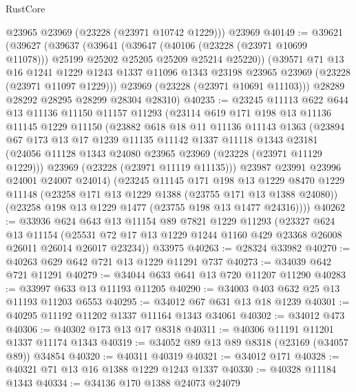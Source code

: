 \begin{lexlean}{RustCore}
\begin{coremodule}
      @23965
      @23969
      (@23228 (@23971 @10742 @1229)))
    @23969
@40149 := @39621
    (@39627
      (@39637
        (@39641
          (@39647
            (@40106 (@23228 (@23971 @10699 @11078)))
            @25199
            @25202
            @25205
            @25209
            @25214
            @25220))
        (@39571
          @71
          @13
          @16
          @1241
          @1229
          @1243
          @1337
          @11096
          @1343
          @23198
          @23965
          @23969
          (@23228 (@23971 @11097 @1229)))
        @23969
        (@23228 (@23971 @10691 @11103)))
      @28289
      @28292
      @28295
      @28299
      @28304
      @28310)
@40235 := @23245
    @11113
    @622
    @644
    @13
    @11136
    @11150
    @11157
    @11293
    (@23114
      @619
      @171
      @198
      @13
      @11136
      @11145
      @1229
      @11150
      (@23882
        @618
        @18
        @11
        @11136
        @11143
        @1363
        (@23894
          @67
          @173
          @13
          @17
          @1239
          @11135
          @11142
          @1337
          @11118
          @1343
          @23181
          (@24056 @11128 @1343 @24080 @23965 @23969 (@23228 (@23971 @11129 @1229)))
          @23969
          (@23228 (@23971 @11119 @11135)))
        @23987
        @23991
        @23996
        @24001
        @24007
        @24014)
      (@23245
        @11145
        @171
        @198
        @13
        @1229
        @8470
        @1229
        @11148
        (@23258 @171 @13 @1229 @1388 (@23755 @171 @13 @1388 @24080))
        (@23258 @198 @13 @1229 @1477 (@23755 @198 @13 @1477 @24316))))
@40262 := @33936
    @624
    @643
    @13
    @11154
    @89
    @7821
    @1229
    @11293
    (@23327
      @624
      @13
      @11154
      (@25531 @72 @17 @13 @1229 @1244 @1160 @429 @23368 @26008 @26011 @26014 @26017 @23234))
    @33975
@40263 := @28324 @33982
@40270 := @40263 @629 @642 @721 @13 @1229 @11291 @737
@40273 := @34039 @642 @721 @11291
@40279 := @34044 @633 @641 @13 @720 @11207 @11290
@40283 := @33997 @633 @13 @11193 @11205
@40290 := @34003 @403 @632 @25 @13 @11193 @11203 @6553
@40295 := @34012 @67 @631 @13 @18 @1239
@40301 := @40295 @11192 @11202 @1337 @11164 @1343 @34061
@40302 := @34012 @473
@40306 := @40302 @173 @13 @17 @8318
@40311 := @40306 @11191 @11201 @1337 @11174 @1343
@40319 := @34052 @89 @13 @89 @8318 (@23169 (@34057 @89)) @34854
@40320 := @40311 @40319
@40321 := @34012 @171
@40328 := @40321 @71 @13 @16 @1388 @1229 @1243 @1337
@40330 := @40328 @11184 @1343
@40334 := @34136 @170 @1388 @24073 @24079

\end{coremodule}
\end{lexlean}
